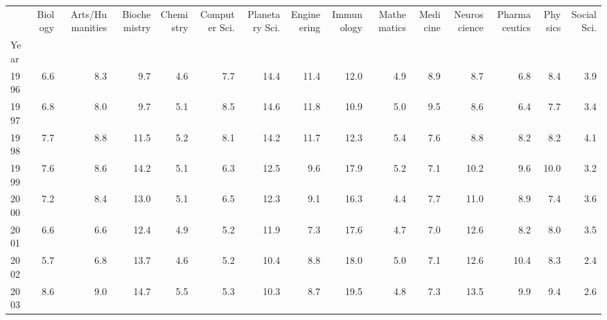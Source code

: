 \begin{tabular}{lrrrrrrrrrrrrrr}
\toprule
{} &  Biology &  Arts/Humanities &  Biochemistry &  Chemistry &  Computer Sci. &  Planetary Sci. &  Engineering &  Immunology &  Mathematics &  Medicine &  Neuroscience &  Pharmaceutics &  Physics &  Social Sci. \\
Year           &          &                  &               &            &                &                 &              &             &              &           &               &                &          &              \\
\midrule
1996           &      6.6 &              8.3 &           9.7 &        4.6 &            7.7 &            14.4 &         11.4 &        12.0 &          4.9 &       8.9 &           8.7 &            6.8 &      8.4 &          3.9 \\
1997           &      6.8 &              8.0 &           9.7 &        5.1 &            8.5 &            14.6 &         11.8 &        10.9 &          5.0 &       9.5 &           8.6 &            6.4 &      7.7 &          3.4 \\
1998           &      7.7 &              8.8 &          11.5 &        5.2 &            8.1 &            14.2 &         11.7 &        12.3 &          5.4 &       7.6 &           8.8 &            8.2 &      8.2 &          4.1 \\
1999           &      7.6 &              8.6 &          14.2 &        5.1 &            6.3 &            12.5 &          9.6 &        17.9 &          5.2 &       7.1 &          10.2 &            9.6 &     10.0 &          3.2 \\
2000           &      7.2 &              8.4 &          13.0 &        5.1 &            6.5 &            12.3 &          9.1 &        16.3 &          4.4 &       7.7 &          11.0 &            8.9 &      7.4 &          3.6 \\
2001           &      6.6 &              6.6 &          12.4 &        4.9 &            5.2 &            11.9 &          7.3 &        17.6 &          4.7 &       7.0 &          12.6 &            8.2 &      8.0 &          3.5 \\
2002           &      5.7 &              6.8 &          13.7 &        4.6 &            5.2 &            10.4 &          8.8 &        18.0 &          5.0 &       7.1 &          12.6 &           10.4 &      8.3 &          2.4 \\
2003           &      8.6 &              9.0 &          14.7 &        5.5 &            5.3 &            10.3 &          8.7 &        19.5 &          4.8 &       7.3 &          13.5 &            9.9 &      9.4 &          2.6 \\

\end{tabular}
